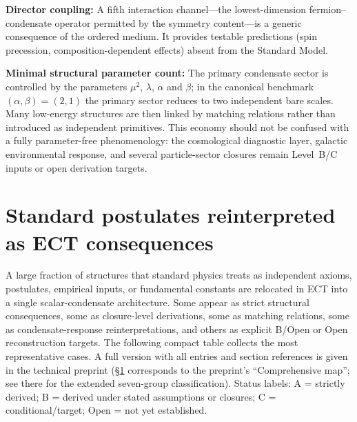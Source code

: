 \documentclass[11pt,a4paper]{article}
\begin{document}
\textbf{Director coupling:} A fifth interaction channel---the lowest-dimension fermion--condensate operator permitted by the symmetry content---is a generic consequence of the ordered medium. It provides testable predictions (spin precession, composition-dependent effects) absent from the Standard Model.

\textbf{Minimal structural parameter count:} The primary condensate sector is controlled by the parameters $\mu^2$, $\lambda$, $\alpha$ and $\beta$; in the canonical benchmark $(\alpha,\beta)=(2,1)$ the primary sector reduces to two independent bare scales. Many low-energy structures are then linked by matching relations rather than introduced as independent primitives. This economy should not be confused with a fully parameter-free phenomenology: the cosmological diagnostic layer, galactic environmental response, and several particle-sector closures remain Level~B/C inputs or open derivation targets.


\section{Standard postulates reinterpreted as ECT consequences}
\label{sec:pop_postulates_reinterpreted}

A large fraction of structures that standard physics treats as
independent axioms, postulates, empirical inputs, or fundamental
constants are relocated in ECT into a single scalar-condensate
architecture. Some appear as strict structural consequences, some as
closure-level derivations, some as matching relations, some as
condensate-response reinterpretations, and others as explicit
B/Open or Open reconstruction targets. The following compact table
collects the most representative cases. A full version with all entries and
section references is given in the technical preprint
(\S\ref{sec:pop_postulates_reinterpreted} corresponds to the
preprint's ``Comprehensive map''; see there for the extended seven-group
classification). Status labels: A = strictly derived;
B = derived under stated assumptions or closures;
C = conditional/target; Open = not yet established.
\end{document}
